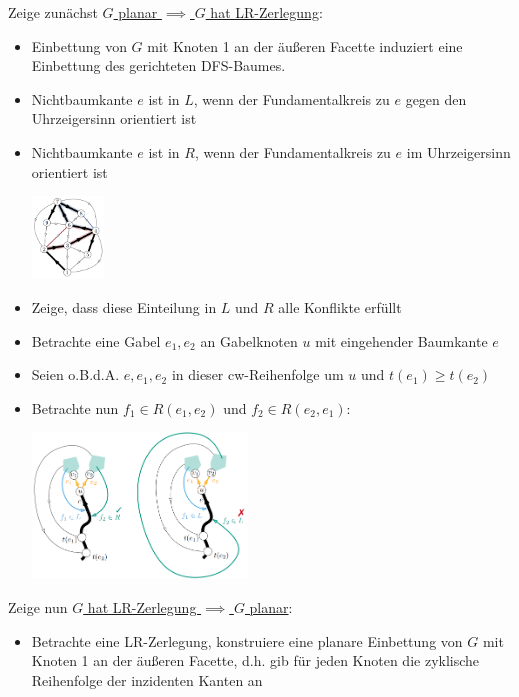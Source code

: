 Zeige zunächst \underline{$G$ planar $\implies$ $G$ hat LR-Zerlegung}:
\begin{itemize}
	\item Einbettung von $G$ mit Knoten 1 an der äußeren Facette induziert eine Einbettung des gerichteten DFS-Baumes.
	\item Nichtbaumkante $e$ ist in $L$, wenn der Fundamentalkreis zu $e$ gegen den Uhrzeigersinn orientiert ist
	\item Nichtbaumkante $e$ ist in $R$, wenn der Fundamentalkreis zu $e$ im Uhrzeigersinn orientiert ist
	\begin{center}
		\includegraphics[width=0.15\textwidth]{images/lr-1.png}
	\end{center}
	\item Zeige, dass diese Einteilung in $L$ und $R$ alle Konflikte erfüllt
	\item Betrachte eine Gabel $e_1,e_2$ an Gabelknoten $u$ mit eingehender Baumkante $e$
	\item Seien o.B.d.A. $e, e_1, e_2$ in dieser cw-Reihenfolge um $u$ und $t(e_1)\geq t(e_2)$
	\item Betrachte nun $f_1\in R(e_1,e_2)$ und $f_2\in R(e_2,e_1)$:
	\begin{center}
		\includegraphics[width=0.45\textwidth]{images/lr-2.png}
	\end{center}
\end{itemize}

Zeige nun \underline{$G$ hat LR-Zerlegung $\implies$ $G$ planar}: 
\begin{itemize}
	\item Betrachte eine LR-Zerlegung, konstruiere eine planare Einbettung von $G$ mit Knoten 1
	an der äußeren Facette, d.h. gib für jeden Knoten die zyklische Reihenfolge der inzidenten Kanten an
\end{itemize}

